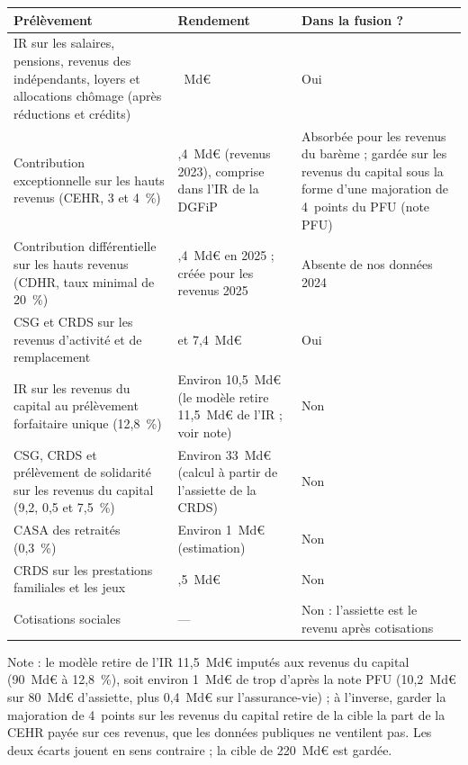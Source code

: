 \documentclass[11pt,a4paper]{article}
\begin{document}
\begin{table}[!ht]\centering\scriptsize
\begin{tabularx}{\linewidth}{@{}>{\raggedright\arraybackslash}X>{\raggedright\arraybackslash}p{3.3cm}>{\raggedright\arraybackslash}p{3.8cm}@{}}
\toprule
Prélèvement & Rendement & Dans la fusion ? \\
\midrule
IR sur les salaires, pensions, revenus des indépendants, loyers et allocations chômage (après réductions et crédits) & 80~Md€ & Oui \\
Contribution exceptionnelle sur les hauts revenus (CEHR, 3 et 4~\%) & 1,4~Md€ (revenus 2023), comprise dans l'IR de la DGFiP & Absorbée pour les revenus du barème ; gardée sur les revenus du capital sous la forme d'une majoration de 4~points du PFU (note PFU) \\
Contribution différentielle sur les hauts revenus (CDHR, taux minimal de 20~\%) & 0,4~Md€ en 2025 ; créée pour les revenus 2025 & Absente de nos données 2024 \\
CSG et CRDS sur les revenus d'activité et de remplacement & 132 et 7,4~Md€ & Oui \\
IR sur les revenus du capital au prélèvement forfaitaire unique (12,8~\%) & Environ 10,5~Md€ (le modèle retire 11,5~Md€ de l'IR ; voir note) & Non \\
CSG, CRDS et prélèvement de solidarité sur les revenus du capital (9,2, 0,5 et 7,5~\%) & Environ 33~Md€ (calcul à partir de l'assiette de la CRDS) & Non \\
CASA des retraités (0,3~\%) & Environ 1~Md€ (estimation) & Non \\
CRDS sur les prestations familiales et les jeux & 0,5~Md€ & Non \\
Cotisations sociales & --- & Non : l'assiette est le revenu après cotisations \\
\bottomrule
\end{tabularx}
\end{table}

{\scriptsize Note : le modèle retire de l'IR 11,5~Md€ imputés aux revenus du capital (90~Md€ à 12,8~\%), soit
environ 1~Md€ de trop d'après la note PFU (10,2~Md€ sur 80~Md€ d'assiette, plus 0,4~Md€ sur l'assurance-vie) ;
à l'inverse, garder la majoration de 4~points sur les revenus du capital retire de la cible la part de la CEHR
payée sur ces revenus, que les données publiques ne ventilent pas. Les deux écarts jouent en sens contraire ;
la cible de 220~Md€ est gardée.\par}
\end{document}
